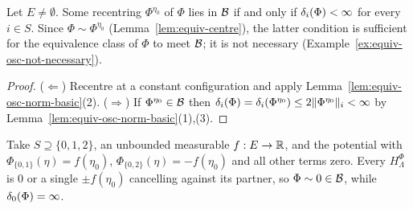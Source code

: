 \begin{theorem}
    \label{thm:equiv-centre-abs-summable}
    \leanok

    Let $E \neq \emptyset$. Some recentring $\Phi^{\eta_0}$ of $\Phi$ lies in $\mathcal{B}$ if and
    only if $\delta_i(\Phi) < \infty$ for every $i \in S$. Since $\Phi \sim \Phi^{\eta_0}$
    (Lemma~\ref{lem:equiv-centre}), the latter condition is sufficient for the equivalence class
    of $\Phi$ to meet $\mathcal{B}$; it is not necessary
    (Example~\ref{ex:equiv-osc-not-necessary}).
\end{theorem}
\begin{proof}
    \leanok

    ($\Leftarrow$) Recentre at a constant configuration and apply
    Lemma~\ref{lem:equiv-osc-norm-basic}(2). ($\Rightarrow$) If $\Phi^{\eta_0} \in \mathcal{B}$ then
    $\delta_i(\Phi) = \delta_i(\Phi^{\eta_0}) \leq 2\|\Phi^{\eta_0}\|_i < \infty$ by
    Lemma~\ref{lem:equiv-osc-norm-basic}(1),(3).
\end{proof}

\begin{example}
    \label{ex:equiv-osc-not-necessary}

    Take $S \supseteq \{0,1,2\}$, an unbounded measurable $f : E \to \mathbb{R}$, and the potential with
    $\Phi_{\{0,1\}}(\eta) = f(\eta_0)$, $\Phi_{\{0,2\}}(\eta) = -f(\eta_0)$ and all other terms
    zero. Every $H_\Lambda^{\Phi}$ is $0$ or a single $\pm f(\eta_0)$ cancelling against its
    partner, so $\Phi \sim 0 \in \mathcal{B}$, while $\delta_0(\Phi) = \infty$.
\end{example}

